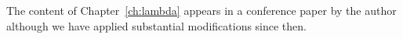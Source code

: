 The content of Chapter~\ref{ch:lambda} appears in
a conference paper by the author \citep{hiraiflops2012}
although we have applied substantial modifications since then.





